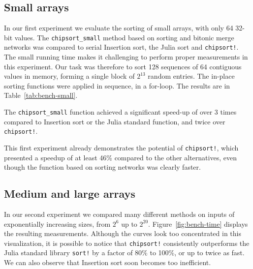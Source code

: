 \documentclass{juliacon}
\begin{document}
\subsection{Small arrays}
In our first experiment we evaluate the sorting of small arrays, with only 64 32-bit values. The {\tt chipsort\_small} method based on sorting and bitonic merge networks was compared to serial Insertion sort, the Julia sort and {\tt chipsort!}. The small running time makes it challenging to perform proper measurements in this experiment. Our task was therefore to sort 128 sequences of 64 contiguous values in memory, forming a single block of $2^{13}$ random entries. The in-place sorting functions were applied in sequence, in a for-loop. The results are in Table~\ref{tab:bench-small}.

The {\tt chipsort\_small} function achieved a significant speed-up of over 3 times compared to Insertion sort or the Julia standard function, and twice over {\tt chipsort!}.

\begin{table}[h]
\label{tab:bench-small}
\end{table}

This first experiment already demonstrates the potential of {\tt chipsort!}, which presented a speedup of at least 46\% compared to the other alternatives, even though the function based on sorting networks was clearly faster.

\subsection{Medium and large arrays}
In our second experiment we compared many different methods on inputs of exponentially increasing sizes, from $2^6$ up to $2^{20}$. Figure~\ref{fig:bench-time} displays the resulting measurements. Although the curves look too concentrated in this visualization, it is possible to notice that {\tt chipsort!} consistently outperforms the Julia standard library {\tt sort!} by a factor of 80\% to 100\%, or up to twice as fast. We can also observe that Insertion sort soon becomes too inefficient.
\end{document}
